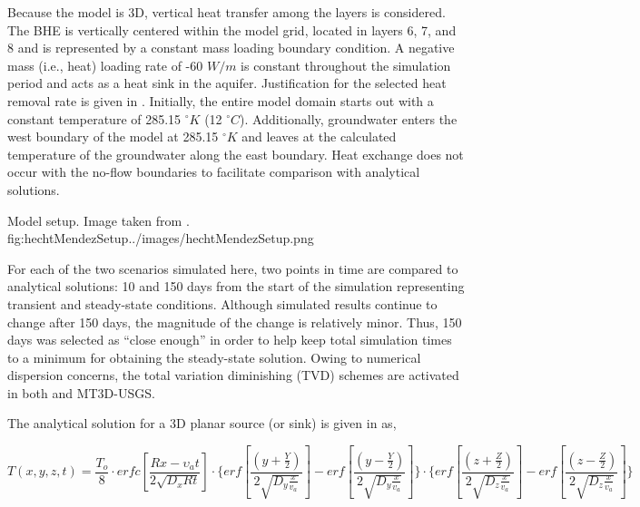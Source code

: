 

Because the model is 3D, vertical heat transfer among the layers is considered.  The BHE is vertically centered within the model grid, located in layers 6, 7, and 8 and is represented by a constant mass loading boundary condition.  A negative mass (i.e., heat) loading rate of -60 $W/m$ is constant throughout the simulation period and acts as a heat sink in the aquifer.  Justification for the selected heat removal rate is given in \cite{hechtMendez2010}.  Initially, the entire model domain starts out with a constant temperature of 285.15 $^{\circ}K$ (12 $^{\circ}C$).  Additionally, groundwater enters the west boundary of the model at 285.15 $^{\circ}K$ and leaves at the calculated temperature of the groundwater along the east boundary.  Heat exchange does not occur with the no-flow boundaries to facilitate comparison with analytical solutions. 

\begin{StandardFigure}{
                                     Model setup.  Image taken from \cite{hechtMendez2010}.
                                     }{fig:hechtMendezSetup}{../images/hechtMendezSetup.png}
\end{StandardFigure}       

For each of the two scenarios simulated here, two points in time are compared to analytical solutions: 10 and 150 days from the start of the simulation representing transient and steady-state conditions.  Although simulated results continue to change after 150 days, the magnitude of the change is relatively minor.  Thus, 150 days was selected as ``close enough'' in order to help keep total simulation times to a minimum for obtaining the steady-state solution.  Owing to numerical dispersion concerns, the total variation diminishing (TVD) schemes are activated in both \mf and MT3D-USGS. 

The analytical solution for a 3D planar source (or sink) is given in \citep{domenico1985} as,

\begin{equation*}
T \left( x, y, z, t \right) = \frac{T_o}{8} \cdot erfc \left[ \frac{Rx - \upsilon_a t}{2 \sqrt{D_x R t}} \right] \cdot \Bigg\{ erf \left[ \frac{ \left( y + \frac{Y}{2} \right)}{2 \sqrt{D_y \frac{x}{v_a}}} \right] -  erf \left[ \frac{ \left( y - \frac{Y}{2} \right)}{2 \sqrt{D_y \frac{x}{v_a}}} \right] \Bigg\} \cdot \Bigg\{ erf \left[ \frac{ \left( z + \frac{Z}{2} \right)}{2 \sqrt{D_z \frac{x}{v_a}}} \right] -  erf \left[ \frac{ \left( z - \frac{Z}{2} \right)}{2 \sqrt{D_z \frac{x}{v_a}}} \right] \Bigg\}
\end{equation*}

